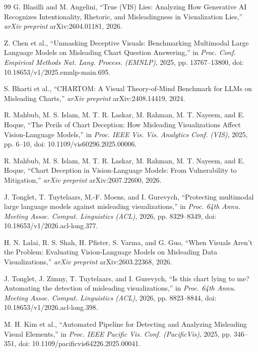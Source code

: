 \documentclass[conference]{IEEEtran}
\begin{document}
\begin{thebibliography}{99}
G. Blasilli and M. Angelini, ``True (VIS) Lies: Analyzing How Generative AI Recognizes Intentionality, Rhetoric, and Misleadingness in Visualization Lies,'' \emph{arXiv preprint} arXiv:2604.01181, 2026.

Z. Chen et al., ``Unmasking Deceptive Visuals: Benchmarking Multimodal Large Language Models on Misleading Chart Question Answering,'' in \emph{Proc. Conf. Empirical Methods Nat. Lang. Process. (EMNLP)}, 2025, pp. 13767--13800, doi: 10.18653/v1/2025.emnlp-main.695.

S. Bharti et al., ``CHARTOM: A Visual Theory-of-Mind Benchmark for LLMs on Misleading Charts,'' \emph{arXiv preprint} arXiv:2408.14419, 2024.

R. Mahbub, M. S. Islam, M. T. R. Laskar, M. Rahman, M. T. Nayeem, and E. Hoque, ``The Perils of Chart Deception: How Misleading Visualizations Affect Vision-Language Models,'' in \emph{Proc. IEEE Vis. Vis. Analytics Conf. (VIS)}, 2025, pp. 6--10, doi: 10.1109/vis60296.2025.00006.

R. Mahbub, M. S. Islam, M. T. R. Laskar, M. Rahman, M. T. Nayeem, and E. Hoque, ``Chart Deception in Vision-Language Models: From Vulnerability to Mitigation,'' \emph{arXiv preprint} arXiv:2607.22600, 2026.

J. Tonglet, T. Tuytelaars, M.-F. Moens, and I. Gurevych, ``Protecting multimodal large language models against misleading visualizations,'' in \emph{Proc. 64th Annu. Meeting Assoc. Comput. Linguistics (ACL)}, 2026, pp. 8329--8349, doi: 10.18653/v1/2026.acl-long.377.

H. N. Lalai, R. S. Shah, H. Pfister, S. Varma, and G. Guo, ``When Visuals Aren't the Problem: Evaluating Vision-Language Models on Misleading Data Visualizations,'' \emph{arXiv preprint} arXiv:2603.22368, 2026.

J. Tonglet, J. Zimny, T. Tuytelaars, and I. Gurevych, ``Is this chart lying to me? Automating the detection of misleading visualizations,'' in \emph{Proc. 64th Annu. Meeting Assoc. Comput. Linguistics (ACL)}, 2026, pp. 8823--8844, doi: 10.18653/v1/2026.acl-long.398.

M. H. Kim et al., ``Automated Pipeline for Detecting and Analyzing Misleading Visual Elements,'' in \emph{Proc. IEEE Pacific Vis. Conf. (PacificVis)}, 2025, pp. 346--351, doi: 10.1109/pacificvis64226.2025.00041.


\end{thebibliography}
\end{document}
